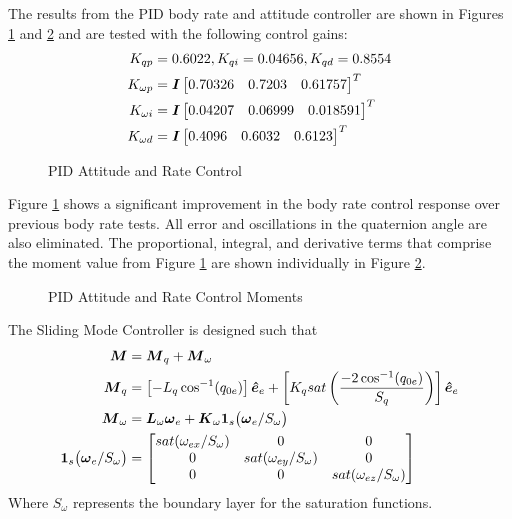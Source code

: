 The results from the PID body rate and attitude controller are shown in Figures \ref{fig:PIDAttitudeAndRateControl} and \ref{fig:PIDAttitudeAndRateControlMoments} and are tested with the following control gains:
\begin{equation}
  \begin{aligned}
    K_{qp} &= 0.6022,K_{qi} = 0.04656,K_{qd} = 0.8554 \\
    K_{\omega p} &= \boldsymbol{I} \begin{bmatrix} 0.70326 & 0.7203 & 0.61757 \end{bmatrix}^T \\
    K_{\omega i} &= \boldsymbol{I} \begin{bmatrix} 0.04207 & 0.06999 & 0.018591 \end{bmatrix}^T \\
    K_{\omega d} &= \boldsymbol{I} \begin{bmatrix} 0.4096 & 0.6032 & 0.6123 \end{bmatrix}^T
  \end{aligned}
\end{equation}
\begin{figure}[H]
  \centerline{}
  \caption{PID Attitude and Rate Control}
  \label{fig:PIDAttitudeAndRateControl}
\end{figure}
Figure \ref{fig:PIDAttitudeAndRateControl} shows a significant improvement in the body rate control response over previous body rate tests.  All error and oscillations in the quaternion angle are also eliminated.  The proportional, integral, and derivative terms that comprise the moment value from Figure \ref{fig:PIDAttitudeAndRateControl} are shown individually in Figure \ref{fig:PIDAttitudeAndRateControlMoments}.
\begin{figure}[H]
  \centerline{}
  \caption{PID Attitude and Rate Control Moments}
  \label{fig:PIDAttitudeAndRateControlMoments}
\end{figure}

The Sliding Mode Controller is designed such that
\begin{equation}
  \begin{aligned}
    \boldsymbol{M} &= \boldsymbol{M}_{q} + \boldsymbol{M}_{\omega} \\
    \boldsymbol{M}_{q} &= \left[- L_{q} \cos^{-1} (q_{0e}) \right] \boldsymbol{\hat{e}}_e + \left[ K_{q} sat \left( \frac{-2\cos^{-1} (q_{0e})}{S_q} \right) \right] \boldsymbol{\hat{e}}_e \\
    \boldsymbol{M}_{\omega} &= \boldsymbol{L}_{\omega} \boldsymbol{\omega}_e + \boldsymbol{K}_{\omega}\boldsymbol{1}_s \big(\boldsymbol{\omega}_e / S_{\omega} \big) \\
    \boldsymbol{1}_s \big(\boldsymbol{\omega}_e / S_{\omega} \big) &= \begin{bmatrix} sat (\omega_{ex} / S_{\omega}) &0 &0 \\ 0 & sat (\omega_{ey} / S_{\omega}) & 0 \\ 0 & 0 & sat (\omega_{ez} / S_{\omega}) \end{bmatrix}
  \end{aligned}
  \label{eqn:sliding_mode_control}
\end{equation}
Where $S_{\omega}$ represents the boundary layer for the saturation functions.


